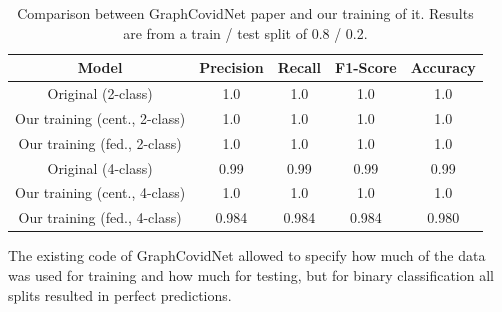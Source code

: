 \begin{table}[htbp]
    \small
    \centering
    \caption{Comparison between GraphCovidNet paper\cite{graph_covid_net} and our training of it. Results are from a train / test split of 0.8 / 0.2.}
    \begin{tabular}{c|c|c|c|c}
        Model & Precision & Recall & F1-Score & Accuracy \\
        \hline
        Original (2-class) & 1.0 & 1.0 & 1.0 & 1.0\\
        Our training (cent., 2-class) & 1.0 & 1.0 & 1.0 & 1.0\\
        Our training (fed., 2-class) & 1.0 & 1.0 & 1.0 & 1.0\\
        Original (4-class) & 0.99 & 0.99 & 0.99 & 0.99\\
        Our training (cent., 4-class) & 1.0 & 1.0 & 1.0 & 1.0\\
        Our training (fed., 4-class) & 0.984 & 0.984 & 0.984 & 0.980\\
    \end{tabular}
    \label{tab:results_graphcovidnet}
\end{table}

The existing code of GraphCovidNet allowed to specify how much of the data was used for training and how much for testing, but for binary classification all splits resulted in perfect predictions.

